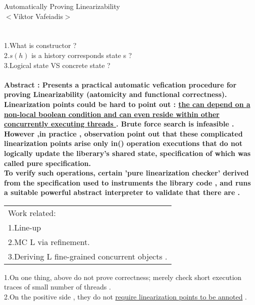 \documentclass{article}
\begin{document}
\noindent
Automatically Proving Linearizability\\
$<$Viktor Vafeiadis$>$ \\\\
{\\
1.What is constructor ? \\
2.$s(h)$ is a history corresponds state s ? \\
3.Logical state VS concrete state ?
}
\\\\
\bfseries{Abstract} :\mdseries{}
Presents a practical automatic vefication procedure for proving Linearizability (aatomicity and functional correctness).\\
Linearization points could be hard to point out : \uline{the can depend on a non-local boolean condition and can even reside within other concurrently executing threads }. Brute force search is infeasible .\\


However ,in practice , observation point out that these complicated linearization points arise only in({\color{blue}{is it true only in ?}}) operation executions that {\color{red} {do not} logically update the liberary's shared state}, specification of which was called 
{\color{red}pure specification}. \\


To verify such operations, certain 'pure linearization checker' derived from the specification used to instruments the library code , and runs a suitable powerful abstract interpreter to validate that there are {\color{red}{no assertion violations}} .\\
\colorbox{green!35!blue!24}{ 
\begin{tabular}{|l|}\hline
Work related: \\
1.Line-up \\
2.MC L via refinement.\\
3.Deriving L fine-grained concurrent objects .\\
\hline
\end{tabular}
}\newline
1.On one thing, above do not prove correctness; merely check short execution traces of small number of threads .\\
2.On the positive side , they do not \uline{require linearization points to be annoted} . \newline
\end{document}
